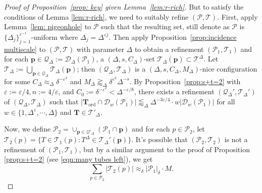 \documentclass{amsart}
\newcommand{\eps}{\varepsilon}
\newcommand{\leapp}{\lessapprox}
\newcommand{\geapp}{\gtrapprox}
\newcommand{\app}{\approx}
\newcommand{\bp}{\mathbf{p}}
\newcommand{\bT}{\mathbf{T}}
\newcommand{\cD}{\mathcal{D}}
\newcommand{\cT}{\mathcal{T}}
\newcommand{\cQ}{\mathcal{Q}}
\newcommand{\cP}{\mathcal{P}}
\newcommand{\ord}{\mathrm{ord}}
\begin{document}
\begin{proof}[Proof of Proposition~\ref{prop: key} given Lemma~\ref{lem:r-rich}]
    But to satisfy the conditions of Lemma \ref{lem:r-rich}, we need to suitably refine $(\cP, \cT)$. 
    First, apply Lemma~\ref{lem: pigeonhole} to $\cP$ such that the resulting set, still denote as $\cP$ is $\{\Delta_j\}_{j=1}^{\eps^{-1}}$-uniform where $\Delta_j= \Delta^{\eps j}$.  Then apply Proposition~\ref{prop:incidence multiscale} to $(\cP, \cT)$ with parameter $\Delta$  to obtain a refinement $(\cP_1, \cT_1)$ and for each $\bp \in \cQ_\Delta := \cD_{\Delta}(\cP_1)$, a $(\Delta, s, C_{\Delta})$-set $\cT_\Delta (\bp)\subset \cT^{\Delta}$. Let $\cT_\Delta := \bigcup_{\bp \in \cQ_\Delta} \cT_\Delta (\bp)$; then $(\cQ_\Delta, \cT_\Delta)$ is a $(\Delta, s, C_\Delta, M_\Delta)$-nice configuration for some $C_\Delta \app_\Delta \delta^{-\eps^2}$ and $M_\Delta \geapp_\Delta \delta^{\eps^2} \Delta^{-s}$.
 By Proposition~\ref{prop:s+t=2} with $\eps := \eps/4, n := 4/\eps$, and $C_0 := \delta^{-\eps^2} < \Delta^{-\eps/8}$, there exists a refinement $(\cQ_\Delta', \cT_\Delta')$ of $(\cQ_\Delta, \cT_\Delta)$ such that 
$|\bT_\ord \cap \cD_w (\cP_1)| \leapp_\Delta \Delta^{-3\eps/4} \cdot w |\cD_w (\cP_1)|$ for all $w \in \{ 1, \Delta^\eps, \cdots, \Delta \}$ and $\bT \in \cT'_\Delta$.

Now, we define $\cP_2=\cup_{\bp \in \cQ'_\Delta} (\cP_1\cap \bp)$ and for each $p\in \cP_2$, let $\cT_2(p)= \{T\in \cT_1(p): T^{\Delta}\in \cT_{\Delta}'(\bp)\}.$ It's possible that $(\cP_2, \cT_2)$ is not a refinement of $(\cP_1, \cT_1)$, but %
by a similar argument to the proof of Proposition \ref{prop:s+t=2} (see \eqref{eqn:many tubes left}), we get
\[
    \sum_{p\in \cP_2} |\cT_2(p)| \approx_{\delta} |\cP_1|_\delta \cdot M.
    \]



\end{proof}
\end{document}
